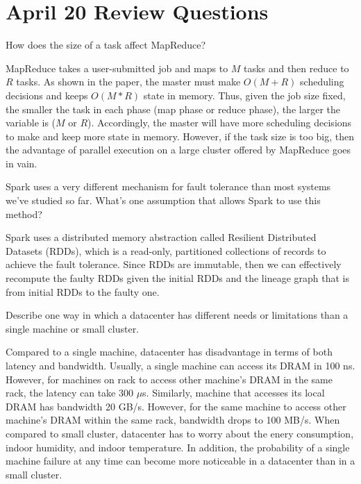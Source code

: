 \section{April 20 Review Questions}
\begin{QandA}
   \item How does the size of a task affect MapReduce?
         \begin{answered}
         MapReduce takes a user-submitted job and maps to $M$ tasks and then reduce to $R$ tasks. As shown in the paper, the master
         must make $O(M + R)$ scheduling decisions and keeps $O(M \ast R)$ state in memory. Thus, given the job size fixed, the smaller
         the task in each phase (map phase or reduce phase), the larger the variable is ($M$ or $R$). Accordingly, the master will have
         more scheduling decisions to make and keep more state in memory. However, if the task size is too big, then the advantage of 
         parallel execution on a large cluster offered by MapReduce goes in vain.
         \end{answered}

   \item Spark uses a very different mechanism for fault tolerance than most systems we've studied so far. What's one assumption that allows Spark to use this method?
         \begin{answered}
         Spark uses a distributed memory abstraction called Resilient Distributed Datasets (RDDs), which is a read-only, partitioned collections
         of records to achieve the fault tolerance. Since RDDs are immutable, then we can effectively recompute the faulty RDDs given the initial
         RDDs and the lineage graph that is from initial RDDs to the faulty one.
         \end{answered}
   \item Describe one way in which a datacenter has different needs or limitations than a single machine or small cluster.
         \begin{answered}
         Compared to a single machine, datacenter has disadvantage in terms of both latency and bandwidth. Usually, a single machine can 
         access its DRAM in 100 ns. However, for machines on rack to access other machine's DRAM in the same rack, the latency can take
         300 $\mu$s. Similarly, machine that accesses its local DRAM has bandwidth 20 GB/s. However, for the same machine to access other
         machine's DRAM within the same rack, bandwidth drops to 100 MB/s. When compared to small cluster, datacenter has to worry about
         the enery consumption, indoor humidity, and indoor temperature. In addition, the probability of a single machine failure at any time
         can become more noticeable in a datacenter than in a small cluster.
         \end{answered}
\end{QandA}




